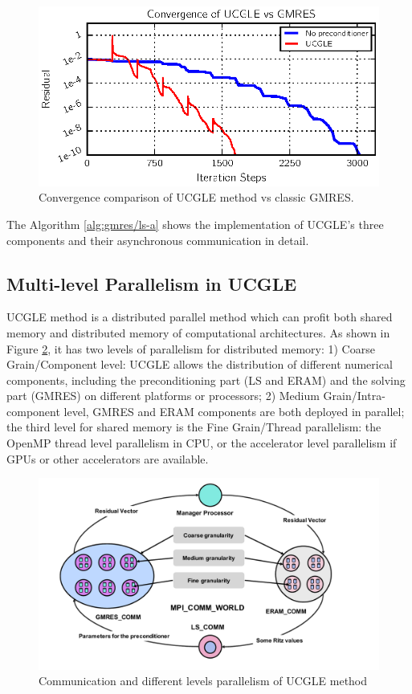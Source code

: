 \begin{figure}[htbp]
	\centering
	\includegraphics[width=6.2in]{fig/conv.eps}
	\caption{Convergence comparison of UCGLE method vs classic GMRES.}
	\label{fig:conv}
\end{figure}

The Algorithm \ref{alg:gmres/ls-a} shows the implementation of UCGLE's three components and their asynchronous communication in detail. 


\subsection{Multi-level Parallelism in UCGLE}

UCGLE method is a distributed parallel method which can profit both shared memory and distributed memory of computational architectures. As shown in Figure \ref{fig:glsa_mpi}, it has two levels of parallelism for distributed memory: 1) Coarse Grain/Component level: UCGLE allows the distribution of different numerical components, including the preconditioning part (LS and ERAM) and the solving part (GMRES) on different platforms or processors; 2) Medium Grain/Intra-component level, GMRES and ERAM components are both deployed in parallel; the third level for shared memory is the Fine Grain/Thread parallelism: the OpenMP thread level parallelism in CPU, or the accelerator level parallelism if GPUs or other accelerators are available. 

\begin{figure}
	\centering
	\includegraphics[width=5.2in]{fig/GLSA_MPI.pdf}
	\caption{Communication and different levels parallelism of UCGLE method}
	\label{fig:glsa_mpi}
\end{figure}

